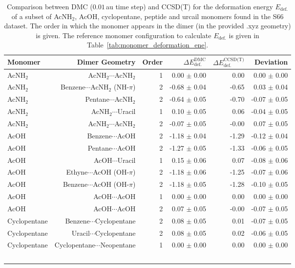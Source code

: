 \begin{table}
\caption{\label{tab:monomer_deformation_ene_validation}Comparison between DMC ($0.01\,$au time step) and CCSD(T) for the deformation energy $E_\text{def.}$ of a subset of AcNH$_2$, AcOH, cyclopentane, peptide and urcail monomers found in the S66 dataset. The order in which the monomer appears in the dimer (in the provided .xyz geometry) is given. The reference monomer configuration to calculate $E_\text{def.}$ is given in Table~\ref{tab:monomer_deformation_ene}.}
\begin{adjustbox}{center}
\begin{tabular}{lrrrrr}
\toprule
Monomer & Dimer Geometry & Order & $\Delta E_\text{def.}^\text{DMC}$ & $\Delta E_\text{def.}^\text{CCSD(T)}$ & Deviation \\ 
\midrule
AcNH$_2$ & AcNH$_2$$\cdots$AcNH$_2$ & 1 & 0.00 $\pm$ 0.00 & 0.00 & 0.00 $\pm$ 0.00 \\
AcNH$_2$ & Benzene$\cdots$AcNH$_2$ (NH-$\pi$) & 2 & -0.68 $\pm$ 0.04 & -0.65 & 0.03 $\pm$ 0.04 \\
AcNH$_2$ & Pentane$\cdots$AcNH$_2$ & 2 & -0.64 $\pm$ 0.05 & -0.70 & -0.07 $\pm$ 0.05 \\
AcNH$_2$ & AcNH$_2$$\cdots$Uracil & 1 & 0.10 $\pm$ 0.05 & 0.06 & -0.04 $\pm$ 0.05 \\
AcNH$_2$ & AcNH$_2$$\cdots$AcNH$_2$ & 2 & -0.07 $\pm$ 0.05 & -0.00 & 0.07 $\pm$ 0.05 \\
AcOH & Benzene$\cdots$AcOH & 2 & -1.18 $\pm$ 0.04 & -1.29 & -0.12 $\pm$ 0.04 \\
AcOH & Pentane$\cdots$AcOH & 2 & -1.27 $\pm$ 0.05 & -1.33 & -0.06 $\pm$ 0.05 \\
AcOH & AcOH$\cdots$Uracil & 1 & 0.15 $\pm$ 0.06 & 0.07 & -0.08 $\pm$ 0.06 \\
AcOH & Ethyne$\cdots$AcOH (OH-$\pi$) & 2 & -1.18 $\pm$ 0.06 & -1.25 & -0.07 $\pm$ 0.06 \\
AcOH & Benzene$\cdots$AcOH (OH-$\pi$) & 2 & -1.18 $\pm$ 0.05 & -1.28 & -0.10 $\pm$ 0.05 \\
AcOH & AcOH$\cdots$AcOH & 1 & 0.00 $\pm$ 0.00 & 0.00 & 0.00 $\pm$ 0.00 \\
AcOH & AcOH$\cdots$AcOH & 2 & 0.07 $\pm$ 0.05 & -0.00 & -0.07 $\pm$ 0.05 \\
Cyclopentane & Benzene$\cdots$Cyclopentane & 2 & 0.08 $\pm$ 0.05 & 0.01 & -0.07 $\pm$ 0.05 \\
Cyclopentane & Uracil$\cdots$Cyclopentane & 2 & 0.08 $\pm$ 0.05 & 0.02 & -0.06 $\pm$ 0.05 \\
Cyclopentane & Cyclopentane$\cdots$Neopentane & 1 & 0.00 $\pm$ 0.00 & 0.00 & 0.00 $\pm$ 0.00 \\
$$
\end{tabular}
\end{adjustbox}
\end{table}

